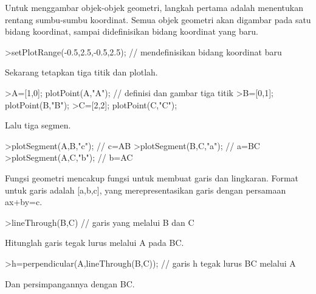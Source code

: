 \documentclass[a4paper,10pt]{article}
\begin{document}
\begin{eulernotebook}
\begin{eulercomment}
\begin{eulercomment}
\begin{eulercomment}
\begin{eulercomment}
\begin{eulercomment}
\begin{eulercomment}
\begin{eulercomment}
\begin{eulercomment}
\begin{eulercomment}
\begin{eulercomment}
\begin{eulercomment}
\begin{eulercomment}
\begin{eulercomment}
\begin{eulercomment}
\begin{eulercomment}
\begin{eulercomment}
\begin{eulercomment}
\begin{eulercomment}
\begin{eulercomment}
\end{eulercomment}
\begin{eulercomment}
Untuk menggambar objek-objek geometri, langkah pertama adalah menentukan rentang sumbu-sumbu
koordinat. Semua objek geometri akan digambar pada satu bidang koordinat, sampai didefinisikan
bidang koordinat yang baru.
\end{eulercomment}
\begin{eulerprompt}
>setPlotRange(-0.5,2.5,-0.5,2.5); // mendefinisikan bidang koordinat baru 
\end{eulerprompt}
\begin{eulercomment}
Sekarang tetapkan tiga titik dan plotlah.
\end{eulercomment}
\begin{eulerprompt}
>A=[1,0]; plotPoint(A,"A"); // definisi dan gambar tiga titik
>B=[0,1]; plotPoint(B,"B");
>C=[2,2]; plotPoint(C,"C");
\end{eulerprompt}
\begin{eulercomment}
Lalu tiga segmen.
\end{eulercomment}
\begin{eulerprompt}
>plotSegment(A,B,"c"); // c=AB
>plotSegment(B,C,"a"); // a=BC
>plotSegment(A,C,"b"); // b=AC
\end{eulerprompt}
\begin{eulercomment}
Fungsi geometri mencakup fungsi untuk membuat garis dan lingkaran.
Format untuk garis adalah [a,b,c], yang merepresentasikan garis dengan
persamaan ax+by=c.
\end{eulercomment}
\begin{eulerprompt}
>lineThrough(B,C) // garis yang melalui B dan C
\end{eulerprompt}
\begin{euleroutput}
  [-1,  2,  2]
\end{euleroutput}
\begin{eulercomment}
Hitunglah garis tegak lurus melalui A pada BC.
\end{eulercomment}
\begin{eulerprompt}
>h=perpendicular(A,lineThrough(B,C)); // garis h tegak lurus BC melalui A
\end{eulerprompt}
\begin{eulercomment}
Dan persimpangannya dengan BC.
\end{eulercomment}
\begin{eulerprompt}

\end{eulerprompt}
\end{eulercomment}
\end{eulercomment}
\end{eulercomment}
\end{eulercomment}
\end{eulercomment}
\end{eulercomment}
\end{eulercomment}
\end{eulercomment}
\end{eulercomment}
\end{eulercomment}
\end{eulercomment}
\end{eulercomment}
\end{eulercomment}
\end{eulercomment}
\end{eulercomment}
\end{eulercomment}
\end{eulercomment}
\end{eulercomment}
\end{eulernotebook}
\end{document}
